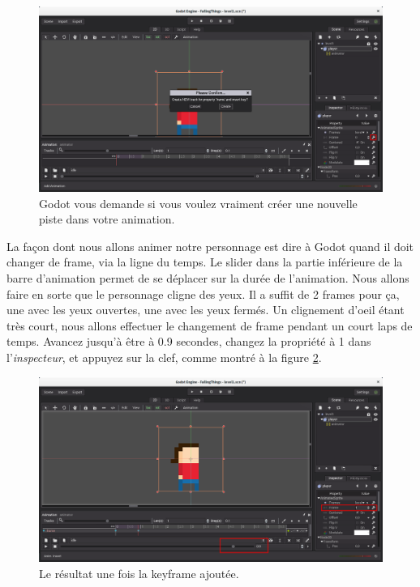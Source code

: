 \begin{figure}
  \begin{center}
    \includegraphics[width=12cm]{img/lvl1-animnewtrack.png}
  \end{center}
  \caption{\label{lvl1-animnewtrack} Godot vous demande si vous voulez vraiment créer une nouvelle piste dans votre animation.}
\end{figure}

La façon dont nous allons animer notre personnage est dire à Godot quand il doit changer de frame, via la ligne du temps. Le slider dans la partie inférieure de la barre d'animation permet de se déplacer sur la durée de l'animation. Nous allons faire en sorte que le personnage cligne des yeux. Il a suffit de 2 frames pour ça, une avec les yeux ouvertes, une avec les yeux fermés. Un clignement d'oeil étant très court, nous allons effectuer le changement de frame pendant un court laps de temps. Avancez jusqu'à être à 0.9 secondes, changez la propriété  à 1 dans l'\emph{inspecteur}, et appuyez sur la clef, comme montré à la figure \ref{lvl1-animaddkeyframe}.

\begin{figure}
  \begin{center}
    \includegraphics[width=12cm]{img/lvl1-animaddkeyframe.png}
  \end{center}
  \caption{\label{lvl1-animaddkeyframe} Le résultat une fois la keyframe ajoutée.}
\end{figure}

